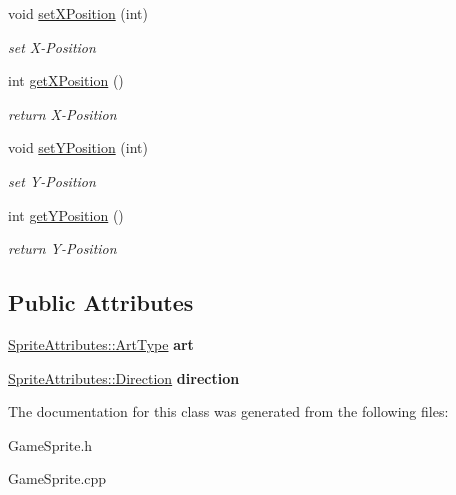 \begin{DoxyCompactItemize}
\mbox{\label{class_game_sprite_adcd973ba50bc01f1a5a8e81d7e468be3}} 
void \mbox{\hyperlink{class_game_sprite_adcd973ba50bc01f1a5a8e81d7e468be3}{set\+X\+Position}} (int)
\begin{DoxyCompactList}\small\item\em set X-\/\+Position \end{DoxyCompactList}\item 
\mbox{\label{class_game_sprite_adf371cf5b8636f7cfd8cb998460f7053}} 
int \mbox{\hyperlink{class_game_sprite_adf371cf5b8636f7cfd8cb998460f7053}{get\+X\+Position}} ()
\begin{DoxyCompactList}\small\item\em return X-\/\+Position \end{DoxyCompactList}\item 
\mbox{\label{class_game_sprite_a31f481d89973565bb2d0d55d0600c266}} 
void \mbox{\hyperlink{class_game_sprite_a31f481d89973565bb2d0d55d0600c266}{set\+Y\+Position}} (int)
\begin{DoxyCompactList}\small\item\em set Y-\/\+Position \end{DoxyCompactList}\item 
\mbox{\label{class_game_sprite_aea645d5397fc4cdbd386e3133e33a802}} 
int \mbox{\hyperlink{class_game_sprite_aea645d5397fc4cdbd386e3133e33a802}{get\+Y\+Position}} ()
\begin{DoxyCompactList}\small\item\em return Y-\/\+Position \end{DoxyCompactList}\end{DoxyCompactItemize}
\subsection*{Public Attributes}
\begin{DoxyCompactItemize}
\item 
\mbox{\label{class_game_sprite_ae05d2bd0e016b9d515a6275292707b71}} 
\mbox{\hyperlink{namespace_sprite_attributes_afb5447c311bc29f0ce8ddfd025c6e998}{Sprite\+Attributes\+::\+Art\+Type}} {\bfseries art}
\item 
\mbox{\label{class_game_sprite_af888e99172d7ea317550147f64da755c}} 
\mbox{\hyperlink{namespace_sprite_attributes_a81213e7721058c470f8001d9d7351608}{Sprite\+Attributes\+::\+Direction}} {\bfseries direction}
\end{DoxyCompactItemize}


The documentation for this class was generated from the following files\+:\begin{DoxyCompactItemize}
\item 
Game\+Sprite.\+h\item 
Game\+Sprite.\+cpp\end{DoxyCompactItemize}
